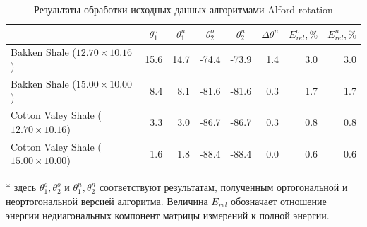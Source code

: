 \documentclass[a4paper,11pt]{article}
\begin{document}
\begin{table}[h]
\footnotesize
\caption{Результаты обработки исходных данных алгоритмами Alford rotation}
\renewcommand{\arraystretch}{1.5}
\begin{tabularx}{\textwidth}{|X|rr|rr|r|rr|}
\hline	
				&\multicolumn{1}{c}{$\theta_1^o$} & \multicolumn{1}{c|}{$\theta_1^n$} & \multicolumn{1}{c}{$\theta_2^o$} & \multicolumn{1}{c|}{$\theta_2^n$} & \multicolumn{1}{c|}{$\Delta\theta^n$}& \multicolumn{1}{c}{$E_{rel}^o, \%$} & \multicolumn{1}{c|}{$E_{rel}^n, \%$} \\ \hline
\hline Bakken Shale ($12.70 \times 10.16$) & 15.6 & 14.7 & -74.4 & -73.9  & 1.4  & 3.0 & 3.0 \\
\hline Bakken Shale ($15.00 \times 10.00$) & 8.4 & 8.1 & -81.6 & -81.6 & 0.3 & 1.7 & 1.7 \\
\hline Cotton Valey Shale ($12.70 \times 10.16$) & 3.3 & 3.0 & -86.7 & -86.7  & 0.3 & 0.8 & 0.8 \\ 
\hline Cotton Valey Shale ($15.00 \times 10.00$) & 1.6 & 1.8 & -88.4 & -88.4  & 0.0  & 0.6 & 0.6 \\	   
 	   \hline
\end{tabularx} 
\begin{flushleft}
* здесь $\theta_1^o,\theta_2^o$ и $\theta_1^n,\theta_2^n$ соответствуют результатам, полученным ортогональной и неортогональной версией алгоритма. Величина $E_{rel}$ обозначает отношение энергии недиагональных компонент матрицы измерений к полной энергии.
\end{flushleft}
\label{tab:std_process_results}
\renewcommand{\arraystretch}{1.0}
\end{table}
\end{document}
